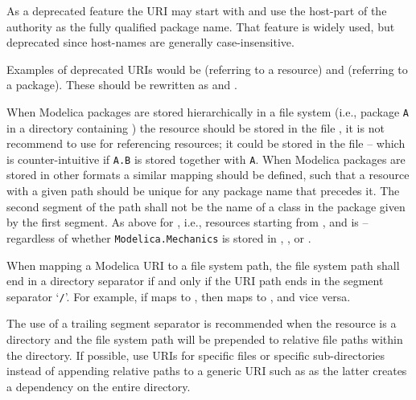 As a deprecated feature the URI may start with  and use the host-part of the authority as the fully qualified package name.
That feature is widely used, but deprecated since host-names are generally case-insensitive.
\begin{nonnormative}
Examples of deprecated URIs would be  (referring to a resource) and  (referring to a package).
These should be rewritten as  and .
\end{nonnormative}

When Modelica packages are stored hierarchically in a file system (i.e., package \lstinline!A! in a directory  containing ) the resource
 should be stored in the file , it is not recommend to use  for referencing resources; it could be stored in the file  -- which is counter-intuitive if \lstinline!A.B! is stored together with \lstinline!A!.
When Modelica packages are stored in other formats a similar mapping should be defined, such that a resource with a given path should be unique for any package name that precedes it.
The second segment of the path shall not be the name of a class in the package given by the first segment.
As above for , i.e., resources starting from , and  is  -- regardless of whether \lstinline!Modelica.Mechanics! is stored in , , or .

When mapping a Modelica URI to a file system path, the file system path shall end in a directory separator if and only if the URI path ends in the segment separator `\lstinline!/!'.
For example, if  maps to , then  maps to , and vice versa.

\begin{nonnormative}
The use of a trailing segment separator is recommended when the resource is a directory and the file system path will be prepended to relative file paths within the directory.
If possible, use URIs for specific files or specific sub-directories instead of appending relative paths to a generic URI such as  as the latter creates a dependency on the entire directory.
\end{nonnormative}


